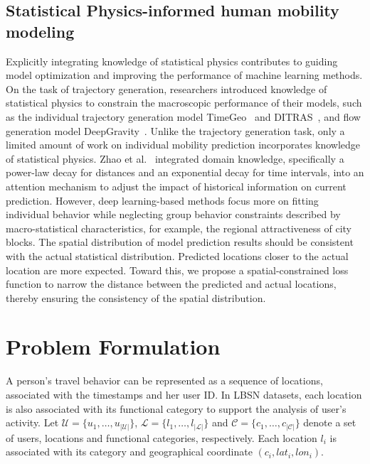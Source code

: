 \documentclass[sigconf]{acmart}
\begin{document}
\subsection{Statistical Physics-informed human mobility modeling}   

    Explicitly integrating knowledge of statistical physics  contributes to guiding model optimization and improving the performance of machine learning methods. On the task of trajectory generation, researchers introduced knowledge of statistical physics to constrain the macroscopic performance of their models, such as the individual trajectory generation model TimeGeo~\cite{jiang2016timegeo} and DITRAS~\cite{pappalardo2018data}, and flow generation model DeepGravity~\cite{simini2021deep}. 
	Unlike the trajectory generation task, only a limited amount of work on individual mobility prediction incorporates knowledge of statistical physics. 
    Zhao et al.~\cite{zhao2020discovering} integrated domain knowledge, specifically a power-law decay for distances and an exponential decay for time intervals, into an attention mechanism to adjust the impact of historical information on current prediction. However, deep learning-based methods focus more on fitting individual behavior while neglecting group behavior constraints described by macro-statistical characteristics, for example, the regional attractiveness of city blocks. The spatial distribution of model prediction results should be consistent with the actual statistical distribution. Predicted locations closer to the actual location are more expected. Toward this, we propose a spatial-constrained loss function to narrow the distance between the predicted and actual locations, thereby ensuring the consistency of the spatial distribution.
    

\section{Problem Formulation}
   A person's travel behavior can be represented as a sequence of locations, associated with the timestamps and her user ID. In LBSN datasets, each location is also associated with its functional category to support the analysis of user's activity. Let $\mathcal{U} = \{u_1, \dots, u_{|\mathcal{U}|}\}$, $\mathcal{L} = \{l_1, \dots, l_{|\mathcal{L}|}\}$ and $\mathcal{C} = \{c_1, \dots, c_{|\mathcal{C}|}\}$ denote a set of users, locations and functional categories, respectively. Each location $l_i$ is associated with its category and geographical coordinate $(c_i, lat_i, lon_i)$.
   
\end{document}

